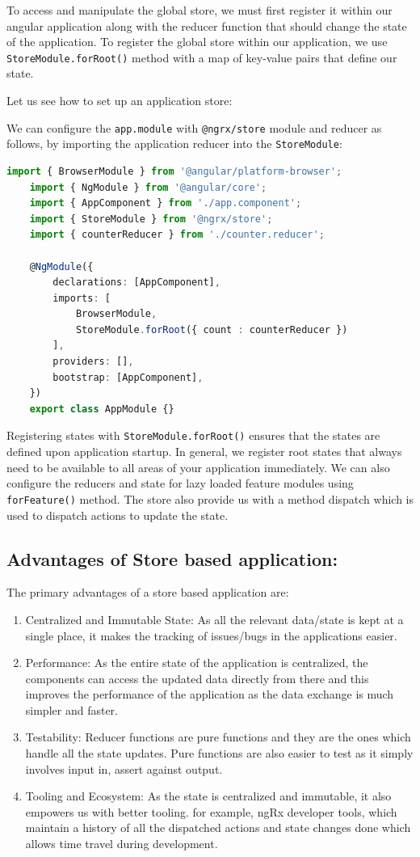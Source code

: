 \documentclass{report}
\begin{document}
To access and manipulate the global store, we must first register it within our angular application along with the reducer function that should change the state of the application. To register the global store within our application, we use \lstinline{StoreModule.forRoot()} method with a map of key-value pairs that define our state.

Let us see how to set up an application store:

We can configure the \lstinline{app.module} with \lstinline{@ngrx/store} module and reducer as follows, by importing the application reducer into the \lstinline{StoreModule}:

\begin{lstlisting}[caption=app.module.ts, language=Typescript]
	import { BrowserModule } from '@angular/platform-browser';
	import { NgModule } from '@angular/core';
	import { AppComponent } from './app.component';
	import { StoreModule } from '@ngrx/store';
	import { counterReducer } from './counter.reducer';

	@NgModule({
		declarations: [AppComponent],
		imports: [
			BrowserModule,
			StoreModule.forRoot({ count : counterReducer })
		],
		providers: [],
		bootstrap: [AppComponent],
	})
	export class AppModule {}
\end{lstlisting}

Registering states with \lstinline{StoreModule.forRoot()} ensures that the states are defined upon application startup. In general, we register root states that always need to be available to all areas of your application immediately.
We can also configure the reducers and state for lazy loaded feature modules using \lstinline{forFeature()} method.
The store also provide us with a method dispatch which is used to dispatch actions to update the state.

\subsection{Advantages of Store based application:}

The primary advantages of a store based application are:
\begin{enumerate}
	\item{Centralized and Immutable State: As all the relevant data/state is kept at a single place, it makes the tracking of issues/bugs in the applications easier.}
	\item{Performance:  As the entire state of the application is centralized, the components can access the updated data directly from there and this improves the performance of the application as the data exchange is much simpler and faster.}
	\item{Testability: Reducer functions are pure functions and they are the ones which handle all the state updates. Pure functions are also easier to test as it simply involves input in, assert against output.}
	\item{Tooling and Ecosystem: As the state is centralized and immutable, it also empowers us with better tooling. for example, ngRx developer tools, which maintain a history of all the dispatched actions and state changes done which allows time travel during development.}
\end{enumerate}
\end{document}
